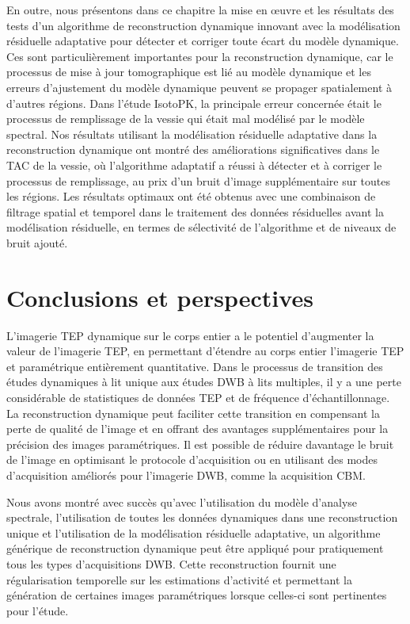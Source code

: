%
En outre, nous présentons dans ce chapitre la mise en œuvre et les résultats des tests d'un algorithme de reconstruction dynamique innovant avec la modélisation résiduelle adaptative pour détecter et corriger toute écart du modèle dynamique. Ces sont particulièrement importantes pour la reconstruction dynamique, car le processus de mise à jour tomographique est lié au modèle dynamique et les erreurs d'ajustement du modèle dynamique peuvent se propager spatialement à d'autres régions. 
Dans l'étude IsotoPK, la principale erreur concernée était le processus de remplissage de la vessie qui était mal modélisé par le modèle spectral.
Nos résultats utilisant la modélisation résiduelle adaptative dans la reconstruction dynamique ont montré des améliorations significatives dans le TAC de la vessie, où l'algorithme adaptatif a réussi à détecter et à corriger le processus de remplissage, au prix d'un bruit d'image supplémentaire sur toutes les régions. Les résultats optimaux ont été obtenus avec une combinaison de filtrage spatial et temporel dans le traitement des données résiduelles avant la modélisation résiduelle, en termes de sélectivité de l'algorithme et de niveaux de bruit ajouté. 

\section*{Conclusions et perspectives}
L'imagerie TEP dynamique sur le corps entier a le potentiel d'augmenter la valeur de l'imagerie TEP, en permettant d'étendre au corps entier l'imagerie TEP et paramétrique entièrement quantitative. 
Dans le processus de transition des études dynamiques à lit unique aux études DWB à lits multiples, il y a une perte considérable de statistiques de données TEP et de fréquence d'échantillonnage. La reconstruction dynamique peut faciliter cette transition en compensant la perte de qualité de l'image et en offrant des avantages supplémentaires pour la précision des images paramétriques. 
Il est possible de réduire davantage le bruit de l'image en optimisant le protocole d'acquisition ou en utilisant des modes d'acquisition améliorés pour l'imagerie DWB, comme la acquisition CBM. 

Nous avons montré avec succès qu'avec l'utilisation du modèle d'analyse spectrale, l'utilisation de toutes les données dynamiques dans une reconstruction unique et l'utilisation de la modélisation résiduelle adaptative, un algorithme générique de reconstruction dynamique peut être appliqué pour pratiquement tous les types d'acquisitions DWB. Cette reconstruction fournit une régularisation temporelle sur les estimations d'activité et permettant la génération de certaines images paramétriques lorsque celles-ci sont pertinentes pour l'étude.


